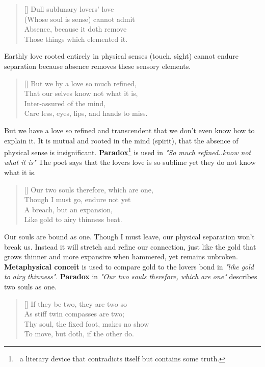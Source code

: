 \begin{verse}[\versewidth]
{\fontverse
Dull sublunary lovers' love\\
\vin (Whose soul is sense) cannot admit\\
Absence, because it doth remove\\
\vin Those things which elemented it.
} 
\end{verse}

Earthly love rooted entirely in physical senses (touch, sight) 
cannot endure separation because absence removes these sensory elements.

\begin{verse}[\versewidth]
{\fontverse
But we by a love so much refined,\\
\vin That our selves know not what it is,\\
Inter-assured of the mind,\\
\vin Care less, eyes, lips, and hands to miss. 
} 
\end{verse}

But we have a love so refined and transcendent that we don't even know how to explain it.
It is mutual and rooted in the mind (spirit), that the absence of 
physical sense is insignificant. \textbf{Paradox}\footnote{
\, a literary device that contradicts itself but contains some truth.} 
is used in \textit{"So much refined..know not what it is"}
The poet says that the lovers love is so sublime yet they do not know what it is.

\begin{verse}[\versewidth]
{\fontverse
Our two souls therefore, which are one,\\
\vin Though I must go, endure not yet\\
A breach, but an expansion,\\
\vin Like gold to airy thinness beat. 
} 
\end{verse}

Our souls are bound as one. Though I must leave, our physical separation won’t break us.
Instead it will stretch and refine our connection, just like the gold that grows thinner and more 
expansive when hammered, yet remains unbroken. \textbf{Metaphysical conceit} is used to compare 
gold to the lovers bond in \textit{"like gold to airy thinness"}. \textbf{Paradox}
in \textit{"Our two souls therefore, which are one"} describes two souls as one.

\begin{verse}[\versewidth]
{\fontverse
If they be two, they are two so\\
\vin As stiff twin compasses are two;\\
Thy soul, the fixed foot, makes no show\\
\vin To move, but doth, if the other do. 
} 
\end{verse}

